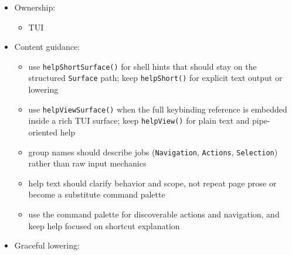 \begin{itemize}
  \begin{itemize}
  \tightlist
  \item
    the controls are already obvious from context and the help text would just restate visible labels
  \end{itemize}
\item
  Ownership:

  \begin{itemize}
  \tightlist
  \item
    TUI
  \end{itemize}
\item
  Content guidance:

  \begin{itemize}
  \tightlist
  \item
    use \texttt{h\allowbreak{}e\allowbreak{}l\allowbreak{}p\allowbreak{}S\allowbreak{}h\allowbreak{}o\allowbreak{}r\allowbreak{}t\allowbreak{}S\allowbreak{}u\allowbreak{}r\allowbreak{}f\allowbreak{}a\allowbreak{}c\allowbreak{}e\allowbreak{}(\allowbreak{})} for shell hints that should stay on the structured \texttt{S\allowbreak{}u\allowbreak{}r\allowbreak{}f\allowbreak{}a\allowbreak{}c\allowbreak{}e} path; keep \texttt{h\allowbreak{}e\allowbreak{}l\allowbreak{}p\allowbreak{}S\allowbreak{}h\allowbreak{}o\allowbreak{}r\allowbreak{}t\allowbreak{}(\allowbreak{})} for explicit text output or lowering
  \item
    use \texttt{h\allowbreak{}e\allowbreak{}l\allowbreak{}p\allowbreak{}V\allowbreak{}i\allowbreak{}e\allowbreak{}w\allowbreak{}S\allowbreak{}u\allowbreak{}r\allowbreak{}f\allowbreak{}a\allowbreak{}c\allowbreak{}e\allowbreak{}(\allowbreak{})} when the full keybinding reference is embedded inside a rich TUI surface; keep \texttt{h\allowbreak{}e\allowbreak{}l\allowbreak{}p\allowbreak{}V\allowbreak{}i\allowbreak{}e\allowbreak{}w\allowbreak{}(\allowbreak{})} for plain text and pipe-oriented help
  \item
    group names should describe jobs (\texttt{N\allowbreak{}a\allowbreak{}v\allowbreak{}i\allowbreak{}g\allowbreak{}a\allowbreak{}t\allowbreak{}i\allowbreak{}o\allowbreak{}n}, \texttt{A\allowbreak{}c\allowbreak{}t\allowbreak{}i\allowbreak{}o\allowbreak{}n\allowbreak{}s}, \texttt{S\allowbreak{}e\allowbreak{}l\allowbreak{}e\allowbreak{}c\allowbreak{}t\allowbreak{}i\allowbreak{}o\allowbreak{}n}) rather than raw input mechanics
  \item
    help text should clarify behavior and scope, not repeat page prose or become a substitute command palette
  \item
    use the command palette for discoverable actions and navigation, and keep help focused on shortcut explanation
  \end{itemize}
\item
  Graceful lowering:


\end{itemize}
